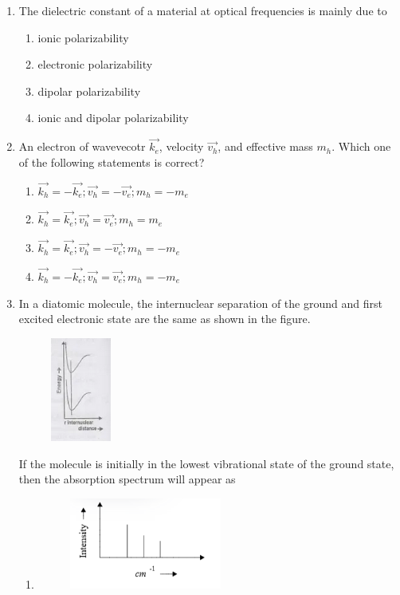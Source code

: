 \documentclass[journal]{IEEEtran}
\numberwithin{equation}{enumi}
\numberwithin{figure}{enumi}
\begin{document}
\begin{enumerate}[start=25]
    \item The dielectric constant of a material at optical frequencies is mainly due to 
    \begin{enumerate}
    	\item ionic polarizability
    	\item electronic polarizability
    	\item dipolar polarizability
    	\item ionic and dipolar polarizability
    \end{enumerate}
    \item An electron of wavevecotr $\vec{k_e}$, velocity $\vec{v_h}$, and effective mass $m_h$. Which one of the following statements is correct?
    \begin{enumerate}
    	\item $\vec{k_h}=-\vec{k_e};\vec{v_h}=-\vec{v_e};m_h=-m_e$
    	\item $\vec{k_h}=\vec{k_e};\vec{v_h}=\vec{v_e};m_h=m_e$
    	\item $\vec{k_h}=\vec{k_e};\vec{v_h}=-\vec{v_e};m_h=-m_e$
    	\item $\vec{k_h}=-\vec{k_e};\vec{v_h}=\vec{v_e};m_h=-m_e$
   \end{enumerate}
    \item In a diatomic molecule, the internuclear separation of the ground and first excited electronic state are the same as shown in the figure.
    \begin{figure}[!ht]
    \centering
    \includegraphics[width=2cm]{figs/Q30.png}
    \caption{}
    \end{figure}
    \newpage
     If the molecule is initially in the lowest vibrational state of the ground state, then the absorption spectrum will appear as
\begin{enumerate}
\item \begin{figure}[!ht]
    \centering
    \includegraphics[width=5cm]{figs/optionA.png}

\end{figure}
\end{enumerate}
\end{enumerate}
\end{document}
